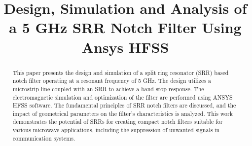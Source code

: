 \documentclass[conference]{IEEEtran}
\begin{document}
\title{Design, Simulation and Analysis of a 5 GHz SRR Notch Filter Using Ansys HFSS}

\author{
\and
{}
\and
{}
\and
\and
{}
\and
}

\maketitle

\begin{abstract}
This paper presents the design and simulation of a split ring resonator (SRR) based notch filter operating at a resonant frequency of 5 GHz. The design utilizes a microstrip line coupled with an SRR to achieve a band-stop response. The electromagnetic simulation and optimization of the filter are performed using ANSYS HFSS software. The fundamental principles of SRR notch filters are discussed, and the impact of geometrical parameters on the filter's characteristics is analyzed. This work demonstrates the potential of SRRs for creating compact notch filters suitable for various microwave applications, including the suppression of unwanted signals in communication systems.
\end{abstract}
\end{document}

